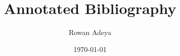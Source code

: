 \documentclass{article}
\title{Annotated Bibliography}
\author{Rowan Adeya}
\date{\today}
\begin{document}
\maketitle
\nocite{*}
\printbibliography
\end{document}
